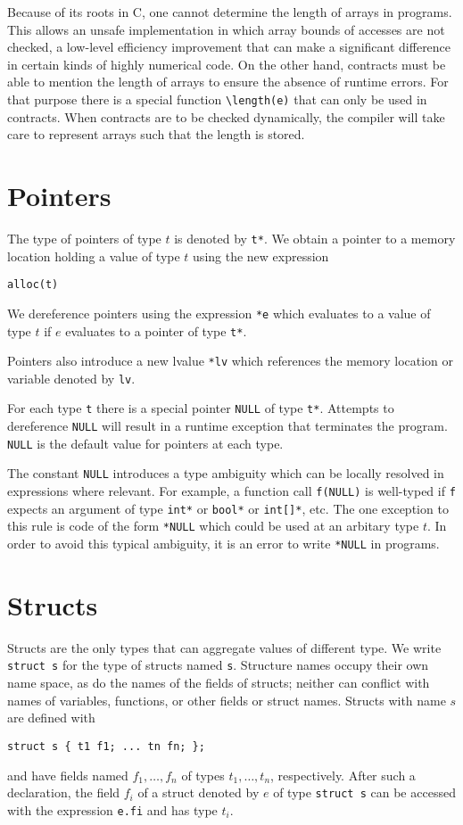 \documentclass[11pt]{article}
\begin{document}
Because of its roots in C, one cannot determine the length of arrays
in programs.  This allows an unsafe implementation in which array
bounds of accesses are not checked, a low-level efficiency improvement
that can make a significant difference in certain kinds of highly
numerical code.  On the other hand, contracts must be able to mention
the length of arrays to ensure the absence of runtime errors.  For
that purpose there is a special function \verb'\length(e)' that can
only be used in contracts.  When contracts are to be checked
dynamically, the compiler will take care to represent arrays such
that the length is stored.

\section{Pointers}

The type of pointers of type $t$ is denoted by \verb't*'.
We obtain a pointer to a memory location holding a
value of type $t$ using the new expression
\begin{verbatim}
alloc(t)
\end{verbatim}
We dereference pointers using the expression \verb'*e'
which evaluates to a value of type $t$ if
$e$ evaluates to a pointer of type \verb't*'.

Pointers also introduce a new lvalue \verb'*lv' which references the
memory location or variable denoted by \verb'lv'.

For each type \verb't' there is a special pointer \verb'NULL'
of type \verb't*'.  Attempts to dereference \verb'NULL' will result
in a runtime exception that terminates the program.  \verb'NULL'
is the default value for pointers at each type.

The constant \verb'NULL' introduces a type ambiguity which can
be locally resolved in expressions where relevant.  For example,
a function call \verb'f(NULL)' is well-typed if \verb'f'
expects an argument of type \verb'int*' or \verb'bool*' or
\verb'int[]*', etc.  The one exception to this rule is code of
the form \verb'*NULL' which could be used at an arbitary type
$t$.  In order to avoid this typical ambiguity, it is an error
to write \verb'*NULL' in programs.

\section{Structs}

Structs are the only types that can aggregate values of different
type.  We write \verb'struct s' for the type of structs named
\verb's'.  Structure names occupy their own name space, as do
the names of the fields of structs; neither can conflict
with names of variables, functions, or other fields or struct
names.  Structs with name $s$ are defined with
\begin{verbatim}
struct s { t1 f1; ... tn fn; };
\end{verbatim}
and have fields named $f_1, \ldots, f_n$ of types $t_1, \ldots, t_n$,
respectively.  After such a declaration, the field $f_i$ of a struct
denoted by $e$ of type \verb'struct s' can be accessed with the
expression \verb'e.fi' and has type $t_i$.
\end{document}
